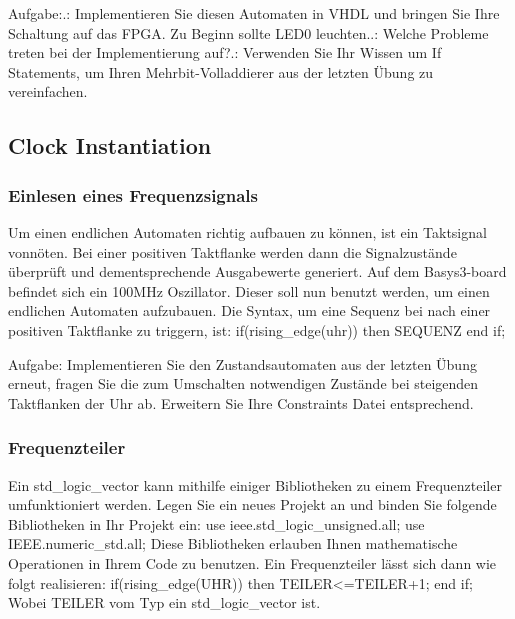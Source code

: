 \documentclass{article}
\begin{document}
Aufgabe:.: Implementieren Sie diesen Automaten in VHDL und bringen Sie Ihre Schaltung auf das FPGA. Zu Beginn sollte LED0 leuchten..: Welche Probleme treten bei der Implementierung auf?.: Verwenden Sie Ihr Wissen um If Statements, um Ihren Mehrbit-Volladdierer aus der letzten \"Ubung zu vereinfachen.

\subsection{Clock Instantiation}
\subsubsection{Einlesen eines Frequenzsignals}
Um einen endlichen Automaten richtig aufbauen zu k\"onnen, ist ein Taktsignal vonn\"oten. Bei einer positiven Taktflanke werden dann die Signalzust\"ande \"uberpr\"uft und dementsprechende Ausgabewerte generiert. Auf dem Basys3-board befindet sich ein 100MHz Oszillator. Dieser soll nun benutzt werden, um einen endlichen Automaten aufzubauen. Die Syntax, um eine Sequenz bei nach einer positiven Taktflanke zu triggern, ist:\newline
if(rising\_edge(uhr)) then\newline
SEQUENZ\newline
end if;\newline

Aufgabe:\newline
Implementieren Sie den Zustandsautomaten aus der letzten \"Ubung erneut, fragen Sie die zum Umschalten notwendigen Zust\"ande bei steigenden Taktflanken der Uhr ab. Erweitern Sie Ihre Constraints Datei entsprechend.\newline

\subsubsection{Frequenzteiler}
Ein std\_logic\_vector kann mithilfe einiger Bibliotheken zu einem Frequenzteiler umfunktioniert werden. Legen Sie ein neues Projekt an und binden Sie folgende Bibliotheken in Ihr Projekt ein:\newline
use ieee.std\_logic\_unsigned.all;\newline
use IEEE.numeric\_std.all;\newline
Diese Bibliotheken erlauben Ihnen mathematische Operationen in Ihrem Code zu benutzen. Ein Frequenzteiler l\"asst sich dann wie folgt realisieren:\newline
if(rising\_edge(UHR)) then\newline
TEILER<=TEILER+1;\newline
end if;\newline
Wobei TEILER  vom Typ ein std\_logic\_vector ist.\newline
\end{document}
